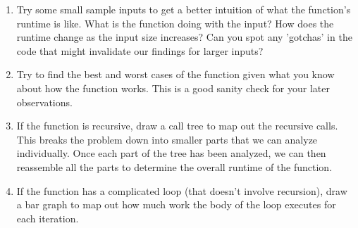 \begin{enumerate}
\item Try some small sample inputs to get a better intuition of what the function's runtime is like. What is the function doing with the input? How does the runtime change as the input size increases? Can you spot any 'gotchas' in the code that might invalidate our findings for larger inputs?
\item Try to find the best and worst cases of the function given what you know about how the function works. This is a good sanity check for your later observations.
\item If the function is recursive, draw a call tree to map out the recursive calls. This breaks the problem down into smaller parts that we can analyze individually. Once each part of the tree has been analyzed, we can then reassemble all the parts to determine the overall runtime of the function.
\item If the function has a complicated loop (that doesn't involve recursion), draw a bar graph to map out how much work the body of the loop executes for each iteration.
\end{enumerate}
